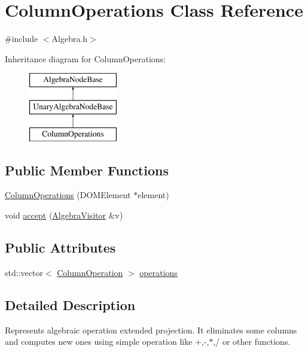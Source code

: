 \hypertarget{class_column_operations}{\section{Column\+Operations Class Reference}
\label{class_column_operations}
}


{\ttfamily \#include $<$Algebra.\+h$>$}

Inheritance diagram for Column\+Operations\+:\begin{figure}[H]
\begin{center}
\leavevmode
\includegraphics[height=3.000000cm]{class_column_operations}
\end{center}
\end{figure}
\subsection*{Public Member Functions}
\begin{DoxyCompactItemize}
\item 
\hyperlink{class_column_operations_a3d2c43e31201238da369906ef863c959}{Column\+Operations} (D\+O\+M\+Element $\ast$element)
\item 
void \hyperlink{class_column_operations_aa33d719aa0407f588cd4ddc2d54368a6}{accept} (\hyperlink{class_algebra_visitor}{Algebra\+Visitor} \&v)
\end{DoxyCompactItemize}
\subsection*{Public Attributes}
\begin{DoxyCompactItemize}
\item 
std\+::vector$<$ \hyperlink{class_column_operation}{Column\+Operation} $>$ \hyperlink{class_column_operations_a31aab19a9f8b104f772c111e920dd682}{operations}
\end{DoxyCompactItemize}


\subsection{Detailed Description}
Represents algebraic operation extended projection. It eliminates some columns and computes new ones using simple operation like +,-\/,$\ast$,/ or other functions. 

